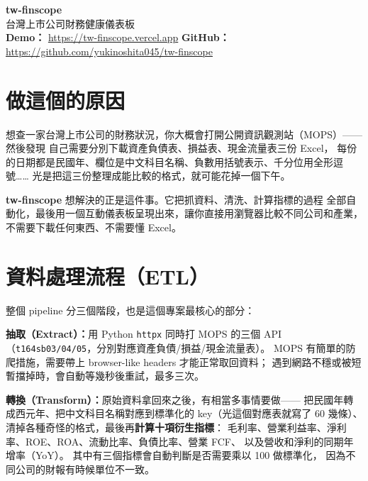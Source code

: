 \documentclass[11pt, a4paper]{article}
\newcommand{\demourl}{https://tw-finscope.vercel.app}
\newcommand{\githuburl}{https://github.com/yukinoshita045/tw-finscope}
\begin{document}

\begin{tcolorbox}[
  colback=primary!8, colframe=primary, arc=3pt,
  boxrule=0.8pt, left=8pt, right=8pt, top=6pt, bottom=6pt
]
  {\LARGE\bfseries\color{primary} tw-finscope}\\[4pt]
  {\large\color{darkgray} 台灣上市公司財務健康儀表板}\\[6pt]
  \small
  \textbf{Demo：}
  \href{\demourl}{\textcolor{urlcolor}{\demourl}}
  \quad\textbf{GitHub：}
  \href{\githuburl}{\textcolor{urlcolor}{\githuburl}}
\end{tcolorbox}

\vspace{4pt}

\section{做這個的原因}

想查一家台灣上市公司的財務狀況，你大概會打開公開資訊觀測站（MOPS）——然後發現
自己需要分別下載資產負債表、損益表、現金流量表三份 Excel，
每份的日期都是民國年、欄位是中文科目名稱、負數用括號表示、千分位用全形逗號……
光是把這三份整理成能比較的格式，就可能花掉一個下午。

\textbf{tw-finscope} 想解決的正是這件事。它把抓資料、清洗、計算指標的過程
全部自動化，最後用一個互動儀表板呈現出來，讓你直接用瀏覽器比較不同公司和產業，
不需要下載任何東西、不需要懂 Excel。

\section{資料處理流程（ETL）}

整個 pipeline 分三個階段，也是這個專案最核心的部分：

\textbf{抽取（Extract）：}用 Python \texttt{httpx} 同時打 MOPS 的三個 API
（\texttt{t164sb03/04/05}，分別對應資產負債/損益/現金流量表）。
MOPS 有簡單的防爬措施，需要帶上 browser-like headers 才能正常取回資料；
遇到網路不穩或被短暫擋掉時，會自動等幾秒後重試，最多三次。

\textbf{轉換（Transform）：}原始資料拿回來之後，有相當多事情要做——
把民國年轉成西元年、把中文科目名稱對應到標準化的 key（光這個對應表就寫了 60 幾條）、
清掉各種奇怪的格式，最後再\textbf{計算十項衍生指標}：
毛利率、營業利益率、淨利率、ROE、ROA、流動比率、負債比率、營業 FCF、
以及營收和淨利的同期年增率（YoY）。
其中有三個指標會自動判斷是否需要乘以 100 做標準化，
因為不同公司的財報有時候單位不一致。
\end{document}
